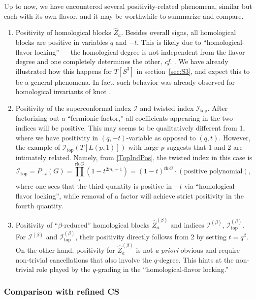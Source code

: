 \documentclass[hyper,letterpaper]{JHEP3}
\newcommand{\be}{\begin{equation}}
\newcommand{\ee}{\end{equation}}
\renewcommand{\hat}{\widehat}
\def\CI{{\mathcal I}}
\begin{document}
Up to now, we have encountered several positivity-related phenomena, similar but each with its own flavor, and it may be worthwhile to summarize and compare.
\begin{enumerate}
	
	\item Positivity of homological blocks $\hat{Z}_a$. Besides overall signs, all homological blocks are positive in variables $q$ and $-t$. This is likely due to ``homological-flavor locking'' --- the homological degree is not independent from the flavor degree and one completely determines the other, {\it cf.} \cite[sec.3.4]{Gukov:2016gkn}. We have already illustrated how this happens for $T[S^3]$ in section~\ref{sec:S3}, and expect this to be a general phenomena. In fact, such behavior was already observed for homological invariants of knot \cite{Aganagic:2011sg,Gorsky:2013jxa,Cherednik:2011nr}.

	\item Positivity of the superconformal index $\CI$ and twisted index $\CI_{\text{top}}$. After factorizing out a ``fermionic factor,'' all coefficients appearing in the two indices will be positive. This may seems to be qualitatively different from 1, where we have positivity in $(q,-t)$-variable as opposed to $(q,t)$. However, the example of $\CI_\text{top}(T[L(p,1)])$ with large $p$ suggests that 1 and 2 are intimately related. Namely, from \eqref{TopIndPos}, the twisted index in this case is
\be
\CI_{\text{top}}=P_{-t}(G)=\prod_i^{\mathrm{rk}\,G}(1-t^{2m_i+1})=(1-t)^{\mathrm{rk}\,G}\cdot (\text{positive polynomial}),
\ee
where one sees that the third quantity is positive in $-t$ via ``homological-flavor locking'', while removal of a factor will achieve strict positivity in the fourth quantity.

	\item Positivity of ``$\beta$-reduced'' homological blocks $\hat{Z}^{(\beta)}_a$ and indices $\CI^{(\beta)}$, $\CI^{(\beta)}_{\text{top}}$. For $\CI^{(\beta)}$ and $\CI^{(\beta)}_{\text{top}}$, their positivity directly follows from 2 by setting $t=q^\beta$. On the other hand, positivity for $\hat{Z}^{(\beta)}_a$ is not \textit{a priori} obvious and require non-trivial cancellations that also involve the $q$-degree. This hints at the non-trivial role played by the $q$-grading in the ``homological-flavor locking.''
\end{enumerate}

\subsubsection{Comparison with refined CS}
\label{sec:refCS}
\end{document}
